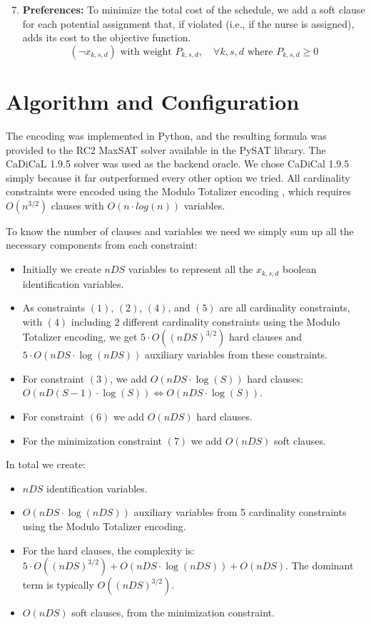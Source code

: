 \documentclass[sigconf, 10pt]{acmart}
\begin{document}
\begin{enumerate}
    \setcounter{enumi}{6}
    \item \textbf{Preferences:} To minimize the total cost of the schedule, we add a soft clause for each potential assignment that, if violated (i.e., if the nurse is assigned), adds its cost to the objective function.
    \begin{equation}
        (\neg x_{k,s,d}) \text{ with weight } P_{k,s,d}, \quad \forall k,s,d \text{ where } P_{k,s,d} \geq 0
    \end{equation}
\end{enumerate}

\section{Algorithm and Configuration}
The encoding was implemented in Python, and the resulting formula was provided to the RC2 MaxSAT solver \cite{rc2} available in the PySAT library. The CaDiCaL 1.9.5 solver \cite{cadical} was used as the backend oracle. We chose CaDiCal 1.9.5 simply because it far outperformed every other option we tried. All cardinality constraints were encoded using the Modulo Totalizer encoding \cite{mtotalizer}, which requires $O(n^{3/2})$ clauses with $O(n \cdot log(n))$ variables. 

To know the number of clauses and variables we need we simply sum up all the necessary components from each constraint:

\begin{itemize}
    \item Initially we create $nDS$ variables to represent all the $x_{k,s,d}$ boolean identification variables.
    \item As constraints $(1)$, $(2)$, $(4)$, and $(5)$ are all cardinality constraints, with $(4)$ including 2 different cardinality constraints using the Modulo Totalizer encoding, we get $5 \cdot O((nDS)^{3/2})$ hard clauses and $5 \cdot O(nDS \cdot \log(nDS))$ auxiliary variables from these constraints.
    \item For constraint $(3)$, we add $O(nDS \cdot \log(S))$ hard clauses: $O(nD(S-1) \cdot \log(S)) \Leftrightarrow O(nDS \cdot \log(S))$.
    \item For constraint $(6)$ we add $O(nDS)$ hard clauses.
    \item For the minimization constraint $(7)$ we add $O(nDS)$ soft clauses.
\end{itemize}

In total we create:
\begin{itemize}
    \item $nDS$ identification variables.
    \item $O(nDS \cdot \log(nDS))$ auxiliary variables from 5 cardinality constraints using the Modulo Totalizer encoding.
    \item For the hard clauses, the complexity is: $5 \cdot O((nDS)^{3/2}) + O(nDS \cdot \log(nDS)) + O(nDS)$. The dominant term is typically $O((nDS)^{3/2})$.
    \item $O(nDS)$ soft clauses, from the minimization constraint.
\end{itemize}
\end{document}
